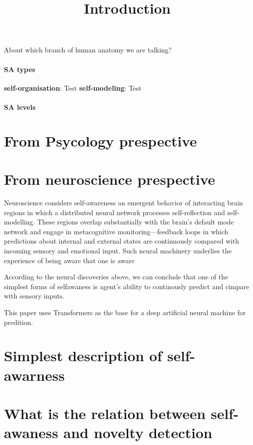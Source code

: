 \documentclass[a4paper]{article}
\title{Introduction}
\date{}
\begin{document}
    \maketitle
    
    About which branch of human anatomy we are talking? 
    
    \paragraph{SA types}
        \textbf{self-organisation}: Test
        \textbf{self-modeling}: Test
    \paragraph{SA levels}
    
    \section{From Psycology prespective}
    
    \section{From neuroscience prespective}
    Neuroscience considers self-awareness an emergent behavior of interacting brain regions in which a distributed neural network processes self-reflection and self-modelling. These regions overlap substantially with the brain's default mode network and engage in metacognitive monitoring—feedback loops in which predictions about internal and external states are continuously compared with incoming sensory and emotional input. Such neural machinery underlies the experience of being aware that one is aware \cite{fleming-frith-2014-metacognition}
    
    According to the neural discoveries above, we can conclude that one of the simplest forms of selfawaness is agent's ability to continously predict and cimpare with sensory inputs.
    
    
    This paper uses Transformers as the base for a deep artificial neural machine for predition.
    \section{Simplest description of self-awarness}
    
    \section{What is the relation between self-awaness and novelty detection}
    
     
     
\end{document}
